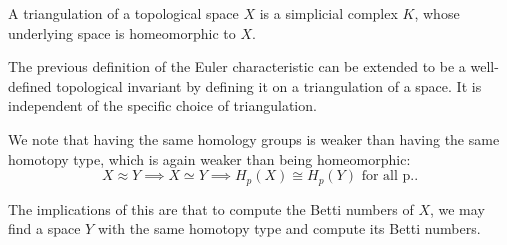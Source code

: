 \begin{definition}
    A triangulation of a topological space $X$ is a simplicial complex $K$, whose underlying space is homeomorphic to $X$.
\end{definition}

The previous definition of the Euler characteristic can be extended to be a well-defined topological invariant by defining it on a triangulation of a space. It is independent of the specific choice of triangulation.

We note that having the same homology groups is weaker than having the same homotopy type, which is again weaker than being homeomorphic:
$$
X \approx Y \implies X \simeq Y \implies H_p(X) \cong H_p(Y) \text{ for all p.}.
$$

The implications of this are that to compute the Betti numbers of $X$, we may find a space $Y$ with the same homotopy type and compute its Betti numbers.